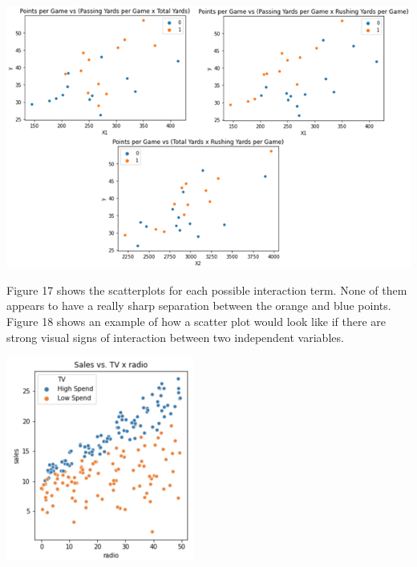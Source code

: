 \documentclass[a4paper,12pt]{report}
\begin{document}
\begin{center}
    \captionsetup{type=figure}
    \includegraphics[width=.9\linewidth]{media/football.png}
\end{center}

Figure 17 shows the scatterplots for each possible interaction term. None of them appears to have a really sharp separation between the orange and blue points. Figure 18 shows an example of how a scatter plot would look like if there are strong visual signs of interaction between two independent variables.

\begin{center}
    \captionsetup{type=figure}
    \includegraphics[width=.9\linewidth]{media/SalesvsTV.png}
\end{center}
\end{document}
